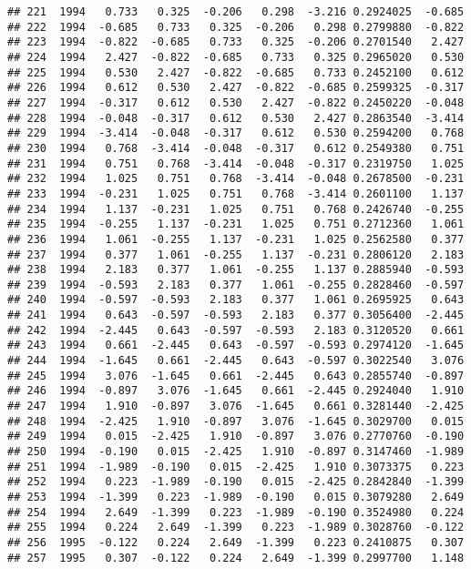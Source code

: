 \documentclass[]{article}
\begin{document}
\begin{verbatim}
## 221  1994   0.733   0.325  -0.206   0.298  -3.216 0.2924025  -0.685
## 222  1994  -0.685   0.733   0.325  -0.206   0.298 0.2799880  -0.822
## 223  1994  -0.822  -0.685   0.733   0.325  -0.206 0.2701540   2.427
## 224  1994   2.427  -0.822  -0.685   0.733   0.325 0.2965020   0.530
## 225  1994   0.530   2.427  -0.822  -0.685   0.733 0.2452100   0.612
## 226  1994   0.612   0.530   2.427  -0.822  -0.685 0.2599325  -0.317
## 227  1994  -0.317   0.612   0.530   2.427  -0.822 0.2450220  -0.048
## 228  1994  -0.048  -0.317   0.612   0.530   2.427 0.2863540  -3.414
## 229  1994  -3.414  -0.048  -0.317   0.612   0.530 0.2594200   0.768
## 230  1994   0.768  -3.414  -0.048  -0.317   0.612 0.2549380   0.751
## 231  1994   0.751   0.768  -3.414  -0.048  -0.317 0.2319750   1.025
## 232  1994   1.025   0.751   0.768  -3.414  -0.048 0.2678500  -0.231
## 233  1994  -0.231   1.025   0.751   0.768  -3.414 0.2601100   1.137
## 234  1994   1.137  -0.231   1.025   0.751   0.768 0.2426740  -0.255
## 235  1994  -0.255   1.137  -0.231   1.025   0.751 0.2712360   1.061
## 236  1994   1.061  -0.255   1.137  -0.231   1.025 0.2562580   0.377
## 237  1994   0.377   1.061  -0.255   1.137  -0.231 0.2806120   2.183
## 238  1994   2.183   0.377   1.061  -0.255   1.137 0.2885940  -0.593
## 239  1994  -0.593   2.183   0.377   1.061  -0.255 0.2828460  -0.597
## 240  1994  -0.597  -0.593   2.183   0.377   1.061 0.2695925   0.643
## 241  1994   0.643  -0.597  -0.593   2.183   0.377 0.3056400  -2.445
## 242  1994  -2.445   0.643  -0.597  -0.593   2.183 0.3120520   0.661
## 243  1994   0.661  -2.445   0.643  -0.597  -0.593 0.2974120  -1.645
## 244  1994  -1.645   0.661  -2.445   0.643  -0.597 0.3022540   3.076
## 245  1994   3.076  -1.645   0.661  -2.445   0.643 0.2855740  -0.897
## 246  1994  -0.897   3.076  -1.645   0.661  -2.445 0.2924040   1.910
## 247  1994   1.910  -0.897   3.076  -1.645   0.661 0.3281440  -2.425
## 248  1994  -2.425   1.910  -0.897   3.076  -1.645 0.3029700   0.015
## 249  1994   0.015  -2.425   1.910  -0.897   3.076 0.2770760  -0.190
## 250  1994  -0.190   0.015  -2.425   1.910  -0.897 0.3147460  -1.989
## 251  1994  -1.989  -0.190   0.015  -2.425   1.910 0.3073375   0.223
## 252  1994   0.223  -1.989  -0.190   0.015  -2.425 0.2842840  -1.399
## 253  1994  -1.399   0.223  -1.989  -0.190   0.015 0.3079280   2.649
## 254  1994   2.649  -1.399   0.223  -1.989  -0.190 0.3524980   0.224
## 255  1994   0.224   2.649  -1.399   0.223  -1.989 0.3028760  -0.122
## 256  1995  -0.122   0.224   2.649  -1.399   0.223 0.2410875   0.307
## 257  1995   0.307  -0.122   0.224   2.649  -1.399 0.2997700   1.148

\end{verbatim}
\end{document}
